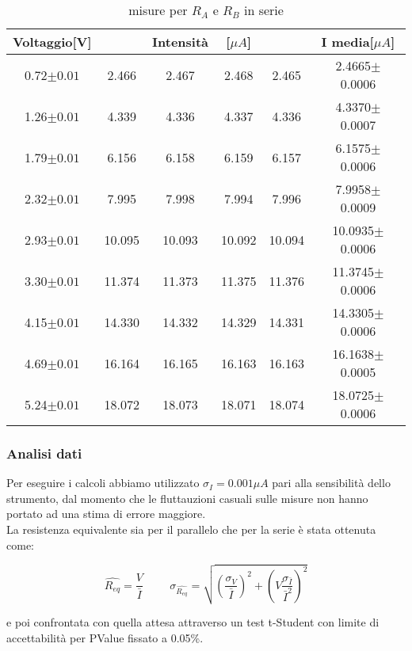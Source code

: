 \documentclass[a4paper]{article}
\theoremstyle{definition}
\begin{document}
\begin{table}[!htbp]
\centering
    \captionsetup{labelformat=empty}
        \caption{misure per \(R_{A}\) e \(R_{B}\) in serie}
    \begin{tabular}{c|cccc|c}
        Voltaggio[V] & & Intensità & [$\mu A$] & & I media[$\mu A$]\\
        \hline
        \hline
        0.72\(\pm 0.01\) & 2.466& 2.467& 2.468& 2.465 & 2.4665\(\pm\)  0.0006 \\
        1.26\(\pm 0.01\) & 4.339& 4.336& 4.337& 4.336 & 4.3370\(\pm\)  0.0007\\
        1.79\(\pm 0.01\) & 6.156& 6.158& 6.159& 6.157 & 6.1575\(\pm\)  0.0006\\
        2.32\(\pm 0.01\) & 7.995& 7.998& 7.994& 7.996 & 7.9958\(\pm\)  0.0009\\
        2.93\(\pm 0.01\) & 10.095& 10.093& 10.092& 10.094 & 10.0935\(\pm\)  0.0006\\
        3.30\(\pm 0.01\) & 11.374& 11.373& 11.375& 11.376 &  11.3745\(\pm\)  0.0006\\
        4.15\(\pm 0.01\) & 14.330& 14.332& 14.329& 14.331 & 14.3305\(\pm\)  0.0006\\
        4.69\(\pm 0.01\) & 16.164& 16.165& 16.163& 16.163 &  16.1638\(\pm\)  0.0005\\
        5.24\(\pm 0.01\) & 18.072& 18.073& 18.071& 18.074 & 18.0725\(\pm\) 0.0006\\
        \hline
        \hline
    \end{tabular}
\end{table}



\subsubsection*{Analisi dati}

Per eseguire i calcoli abbiamo utilizzato \(\sigma_{I} = 0.001\mu A\) pari alla sensibilità dello strumento, dal momento che le fluttauzioni casuali sulle misure non hanno portato ad una stima di errore maggiore.\\
La resistenza equivalente sia per il parallelo che per la serie è stata ottenuta come:

\[\hat{R_{eq}} = \frac{V}{\bar{I}} \hspace{1cm} \sigma_{\hat{R_{eq}}} = \sqrt{ \left ( \frac{\sigma_{V}}{\bar{I}}\right )^{2} + \left( V \frac{ \sigma_{\bar{I}}}{\bar{I}^{2}} \right)^{2} }\]

\noindent e poi confrontata con quella attesa attraverso un test t-Student con limite di accettabilità per PValue fissato a 0.05\%.\\\\\\\\\\\
\end{document}
